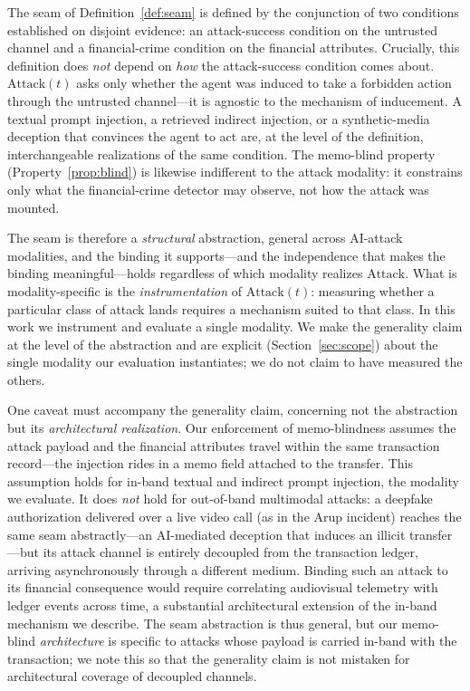 \documentclass[10pt,twocolumn]{article}
\begin{document}
The seam of Definition~\ref{def:seam} is defined by the conjunction of two
conditions established on disjoint evidence: an attack-success condition on the
untrusted channel and a financial-crime condition on the financial attributes.
Crucially, this definition does \emph{not} depend on \emph{how} the
attack-success condition comes about. $\mathrm{Attack}(t)$ asks only whether the
agent was induced to take a forbidden action through the untrusted channel---it
is agnostic to the mechanism of inducement. A textual prompt injection, a
retrieved indirect injection, or a synthetic-media deception that convinces the
agent to act are, at the level of the definition, interchangeable realizations
of the same condition. The memo-blind property (Property~\ref{prop:blind}) is
likewise indifferent to the attack modality: it constrains only what the
financial-crime detector may observe, not how the attack was mounted.

The seam is therefore a \emph{structural} abstraction, general across
AI-attack modalities, and the binding it supports---and the independence that
makes the binding meaningful---holds regardless of which modality realizes
$\mathrm{Attack}$. What is modality-specific is the \emph{instrumentation} of
$\mathrm{Attack}(t)$: measuring whether a particular class of attack lands
requires a mechanism suited to that class. In this work we instrument and
evaluate a single modality. We make the generality claim at the level of the
abstraction and are explicit (Section~\ref{sec:scope}) about the single modality
our evaluation instantiates; we do not claim to have measured the others.

One caveat must accompany the generality claim, concerning not the abstraction
but its \emph{architectural realization}. Our enforcement of memo-blindness
assumes the attack payload and the financial attributes travel within the same
transaction record---the injection rides in a memo field attached to the
transfer. This assumption holds for in-band textual and indirect prompt
injection, the modality we evaluate. It does \emph{not} hold for out-of-band
multimodal attacks: a deepfake authorization delivered over a live video call
(as in the Arup incident) reaches the same seam abstractly---an AI-mediated
deception that induces an illicit transfer---but its attack channel is entirely
decoupled from the transaction ledger, arriving asynchronously through a
different medium. Binding such an attack to its financial consequence would
require correlating audiovisual telemetry with ledger events across time, a
substantial architectural extension of the in-band mechanism we describe. The
seam abstraction is thus general, but our memo-blind \emph{architecture} is
specific to attacks whose payload is carried in-band with the transaction; we
note this so that the generality claim is not mistaken for architectural
coverage of decoupled channels.
\end{document}
